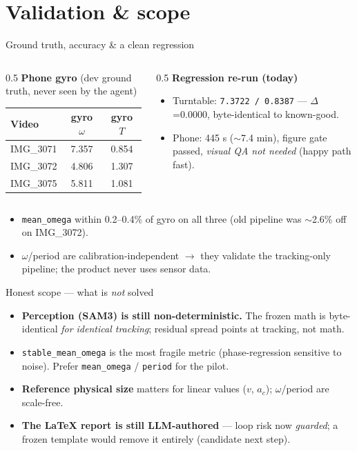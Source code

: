 \documentclass[10pt,aspectratio=169]{beamer}
\newcommand{\gd}[1]{\textcolor{good}{#1}}
\begin{document}
\section{Validation \& scope}

\begin{frame}{Ground truth, accuracy \& a clean regression}
\begin{columns}[T]
\begin{column}{0.5\textwidth}
\textbf{Phone gyro} (dev ground truth, never seen by the agent)
\centering\footnotesize
\begin{tabular}{lcc}
\toprule
Video & gyro $\omega$ & gyro $T$ \\
\midrule
IMG\_3071 & 7.357 & 0.854 \\
IMG\_3072 & 4.806 & 1.307 \\
IMG\_3075 & 5.811 & 1.081 \\
\bottomrule
\end{tabular}
\end{column}
\begin{column}{0.5\textwidth}
\textbf{Regression re-run (today)}
\begin{itemize}\footnotesize
  \item Turntable: \texttt{7.3722 / 0.8387} --- \gd{$\Delta$=0.0000, byte-identical} to known-good.
  \item Phone: 445 s ($\sim$7.4 min), figure gate passed, \emph{visual QA not needed} (happy path fast).
\end{itemize}
\end{column}
\end{columns}
\vspace{0.4em}
\begin{itemize}\footnotesize
  \item \texttt{mean\_omega} within \gd{0.2--0.4\%} of gyro on all three (old pipeline was $\sim$2.6\% off on IMG\_3072).
  \item $\omega$/period are calibration-independent $\to$ they validate the tracking-only pipeline; the product never uses sensor data.
\end{itemize}
\end{frame}

\begin{frame}{Honest scope --- what is \emph{not} solved}
\begin{itemize}
  \item \textbf{Perception (SAM3) is still non-deterministic.} The frozen math is byte-identical \emph{for identical tracking}; residual spread points at tracking, not math.
  \item \texttt{stable\_mean\_omega} is the most fragile metric (phase-regression sensitive to noise). Prefer \texttt{mean\_omega} / \texttt{period} for the pilot.
  \item \textbf{Reference physical size} matters for linear values ($v$, $a_c$); $\omega$/period are scale-free.
  \item \textbf{The LaTeX report is still LLM-authored} --- loop risk now \emph{guarded}; a frozen template would remove it entirely (candidate next step).
\end{itemize}
\end{frame}
\end{document}

